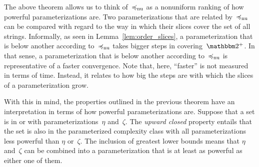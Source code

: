 \label{p:powerful_nuparameterizations}%
The above theorem allows us to think of~$\preccurlyeq_\mathrm{nu}$ as a nonuniform ranking of how powerful parameterizations are.
Two parameterizations that are related by~$\preccurlyeq_\mathrm{nu}$ can be compared with regard to the way in which their slices cover the set of all strings.
Informally, as seen in Lemma~\ref{lem:order_slices}, a parameterization that is below another according to~$\preccurlyeq_\mathrm{nu}$ takes bigger steps in covering~$\binary^+$.
In that sense, a parameterization that is below another according to~$\preccurlyeq_\mathrm{nu}$ is representative of a faster convergence.
Note that, here, \enquote{faster} is not measured in terms of time.
Instead, it relates to how big the steps are with which the slices of a parameterization grow.

With this in mind, the properties outlined in the previous theorem have an interpretation in terms of how powerful parameterizations are.
Suppose that a set is in  or  with parameterizations~$\eta$ and~$\zeta$.
The \emph{upward closed} property entails that the set is also in the parameterized complexity class with all parameterizations less powerful than $\eta$ or~$\zeta$.
The inclusion of greatest lower bounds means that $\eta$ and~$\zeta$ can be combined into a parameterization that is at least as powerful as either one of them.

